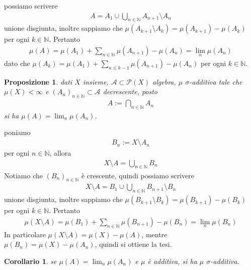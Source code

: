 \documentclass[oneside, 11pt]{amsbook}
\makeatletter
\newcommand{\0}{{(0)}}
\newcommand{\3}{{(3)}}
\theoremstyle{colonplain}
\newtheorem{prop}[thm]{Proposizione}
\newtheorem{cor}[thm]{Corollario}
\theoremstyle{colondefinition}
\theoremstyle{colonremark}
\numberwithin{equation}{chapter}
\renewcommand{\proofname}{Dimostrazione}
\renewenvironment{proof}[1][\proofname]{\par
  \pushQED{\qed}%
  \normalfont \topsep6\p@\@plus6\p@\relax
  \trivlist
  \item[\hskip\labelsep\bfseries #1:]\ignorespaces
}{%
  \popQED\endtrivlist\@endpefalse
}
\makeatother
\begin{document}
\begin{proof}
possiamo scrivere
\begin{align}
    A = A_1 \cup \bigcup_{n \in \mathbb{N}} A_{n + 1} \setminus A_n
\end{align}
unione disgiunta, inoltre sappiamo che $\mu(A_{k + 1} \setminus A_k) = \mu(A_{k + 1}) - \mu(A_k)$ per ogni $k \in \mathbb{N}$. Pertanto
\begin{align}
    \mu(A) = \mu(A_1) + \sum_{n \in \mathbb{N}} \mu(A_{n + 1}) - \mu(A_n) = \lim_n \mu(A_n)
\end{align}
dato che $\mu(A_k) = \mu(A_1) + \sum_{n \leq k - 1} \mu(A_{n + 1}) - \mu(A_n)$ per ogni $k \in \mathbb{N}$.
\end{proof}
\begin{prop}\label{LimDecresc}
dati $X$ insieme, $\mathcal{A} \subset \mathcal{P}(X)$ algebra, $\mu$ $\sigma$-additiva tale che $\mu(X) < \infty$ e $(A_n)_{n \in \mathbb{N}} \subset \mathcal{A}$ decrescente, posto
\begin{align}
    A := \bigcap_{n \in \mathbb{N}} A_n
\end{align}
si ha $\mu(A) = \lim_n \mu(A_n)$.
\end{prop}

\begin{proof} poniamo
\begin{align}
    B_n := X \setminus A_n
\end{align}
per ogni $n \in \mathbb{N}$, allora
\begin{align}
    X \setminus A = \bigcup_{n \in \mathbb{N}} B_n
\end{align}
Notiamo che $(B_n)_{n \in \mathbb{N}}$ è crescente, quindi possiamo scrivere
\begin{align}
    X \setminus A = B_1 \cup \bigcup_{n \in \mathbb{N}} B_{n + 1} \setminus B_n
\end{align}
unione disgiunta, inoltre sappiamo che $\mu(B_{k + 1} \setminus B_k) = \mu(B_{k + 1}) - \mu(B_k)$ per ogni $k \in \mathbb{N}$. Pertanto
\begin{align}
    \mu(X \setminus A) = \mu(B_1) + \sum_{n \in \mathbb{N}} \mu(B_{n + 1}) - \mu(B_n) = \lim_n \mu(B_n)
\end{align}
In particolare $\mu(X \setminus A) = \mu(X) - \mu(A)$, mentre $\mu(B_n) = \mu(X) - \mu(A_n)$, quindi si ottiene la tesi.
\end{proof}
\begin{cor}
se $\mu(A) = \lim_n \mu(A_n)$ e $\mu$ è additiva, si ha $\mu$ $\sigma$-additiva.
\end{cor}
\end{document}
